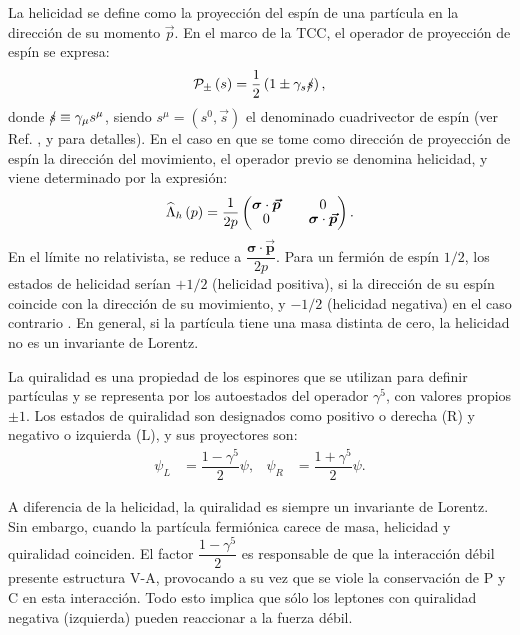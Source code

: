 La helicidad se define como la proyección del espín de una partícula en la dirección de su momento $\vec{p}$. En el marco de la TCC, el operador de proyección de espín se expresa:
\begin{equation}
\mathcal{P}_{\pm}\left(s\right)=\dfrac{1}{2} \left(1 \pm \gamma _{s}\slashed{s}\right),
\end{equation} 
donde $\slashed{s}\equiv \gamma_{\mu} s^{\mu}$, siendo $s^{\mu}=\left(s^0, \vec{s}\right)$ el denominado cuadrivector de espín (ver Ref. \cite{GreinerRQM}, \cite{Griffiths2008} y \cite{MCR} para detalles). En el caso en que se tome como dirección de proyección de espín la dirección del movimiento, el operador previo se denomina helicidad, y viene determinado por la expresión:
\begin{equation}
\begingroup 
\renewcommand*{\arraystretch}{0.8}
\setlength\arraycolsep{10pt}
\widehat{\Lambda}_{h}\left(p\right)=\dfrac{1}{2p} \begin{pmatrix} 
\boldsymbol{\sigma} \cdot \boldsymbol{\vec{p}} & 0 \\ 0 & \boldsymbol{\sigma} \cdot \boldsymbol{\vec{p}} \end{pmatrix}.
\endgroup
\end{equation}
\newline
En el límite no relativista, se reduce a $\dfrac{\boldsymbol{\sigma} \cdot \boldsymbol{\vec{p}} }{2p}$. Para un fermión de espín $1/2$, los estados de helicidad serían $+1/2$ (helicidad positiva), si la dirección de su espín coincide con la dirección de su movimiento, y $-1/2$ (helicidad negativa) en el caso contrario \cite{Bettini}. En general, si la partícula tiene una masa distinta de cero, la helicidad no es un invariante de Lorentz.

La quiralidad es una propiedad de los espinores que se utilizan para definir partículas y se representa por los autoestados del operador $\gamma^5$, con valores propios $\pm 1$. Los estados de quiralidad son designados como positivo o derecha (R) y negativo o izquierda (L), y sus proyectores son:
\begin{align}
\psi_L &= \dfrac{1-\gamma^5}{2}\psi , & \psi_R &= \dfrac{1+\gamma^5}{2}\psi .
\end{align}

A diferencia de la helicidad, la quiralidad es siempre un invariante de Lorentz. Sin embargo, cuando la partícula fermiónica carece de masa, helicidad y quiralidad coinciden.
El factor $\dfrac{1-\gamma^5}{2}$ es responsable de que la interacción débil presente estructura V-A, provocando a su vez que se viole la conservación de P y C en esta interacción. Todo esto implica que sólo los leptones con quiralidad negativa (izquierda) pueden reaccionar a la fuerza débil.